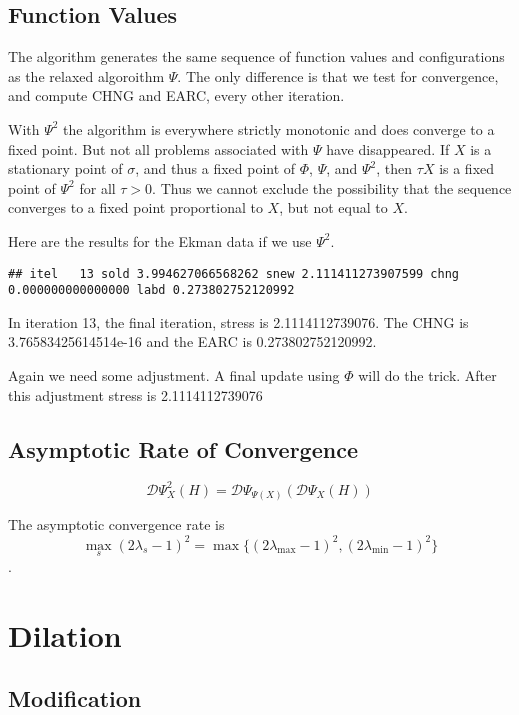 \documentclass[
  12pt,
]{article}
\begin{document}
\subsection{Function Values}\label{function-values-5}

The algorithm generates the same sequence of function values
and configurations as the relaxed algoroithm \(\Psi\). The only difference is that we
test for convergence, and compute CHNG and EARC, every other
iteration.

With \(\Psi^2\) the algorithm is everywhere strictly monotonic and does
converge to a fixed point. But not all problems associated with \(\Psi\)
have disappeared.
If \(X\) is a stationary point of \(\sigma\), and thus a fixed
point of \(\Phi\), \(\Psi\), and \(\Psi^2\), then \(\tau X\) is a
fixed point of \(\Psi^2\) for all \(\tau>0\). Thus we cannot
exclude the possibility that the sequence converges to
a fixed point proportional to \(X\), but not equal to \(X\).

Here are the results for the Ekman data if we use \(\Psi^2\).

\begin{verbatim}
## itel   13 sold 3.994627066568262 snew 2.111411273907599 chng 0.000000000000000 labd 0.273802752120992
\end{verbatim}

In iteration 13, the final iteration, stress is 2.1114112739076. The CHNG is 3.76583425614514e-16 and the EARC is 0.273802752120992.

Again we need some adjustment. A final update using \(\Phi\) will do the trick.
After this adjustment stress is 2.1114112739076

\subsection{Asymptotic Rate of Convergence}\label{asymptotic-rate-of-convergence-5}

\[
\mathcal{D}\Psi^2_X(H)=\mathcal{D}\Psi_{\Psi(X)}(\mathcal{D}\Psi_X(H))
\]

The asymptotic convergence rate is
\[
\max_s (2\lambda_s-1)^2=\max\{ (2\lambda_\text{max}-1)^2, (2\lambda_\text{min}-1)^2\}
\].

\section{Dilation}\label{dilation}

\subsection{Modification}\label{modification-5}
\end{document}
